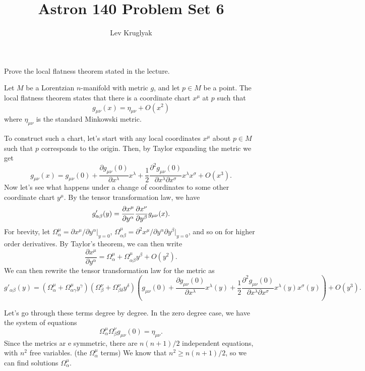 \documentclass{../../templates/lkx_pset}
\title{Astron 140 Problem Set 6}
\author{Lev Kruglyak}
\begin{document}
\maketitle

\begin{problem}{1}
Prove the local flatness theorem stated in the lecture.
\end{problem}

\begin{solution}
	Let $M$ be a Lorentzian $n$-manifold with metric $g$, and let $p\in M$ be a point.
	The local flatness theorem states that there is a coordinate chart $x^{\mu}$ at $p$ such that
	\[
		g_{\mu\nu}(x) = \eta_{\mu\nu} + O(x^2)
	\]
	where $\eta_{\mu\nu}$ is the standard Minkowski metric.

	To construct such a chart, let's start with any local coordinates $x^{\mu}$ about $p\in M$ such that $p$ corresponds to the origin. Then, by Taylor expanding the metric we get
	\[
		g_{\mu\nu}(x) = g_{\mu\nu}(0) + \frac{\partial g_{\mu\nu}(0)}{\partial x^{\lambda}} x^{\lambda} + \frac{1}{2}\frac{\partial^2 g_{\mu\nu}(0)}{\partial x^{\lambda} \partial x^{\sigma}} x^{\lambda} x^{\sigma} + O(x^3).
	\]
	Now let's see what happens under a change of coordinates to some other coordinate chart $y^{\mu}$. By the tensor transformation law, we have
	\[
		g'_{\alpha\beta}(y) = \frac{\partial x^{\mu}}{\partial y^\alpha}\frac{\partial x^\nu}{\partial y^\beta} g_{\mu\nu}(x).
	\]
	For brevity, let $\Omega^\mu_\alpha = \partial x^\mu / \partial y^{\alpha}|_{y=0}$, $\Omega^\mu_{\alpha\beta} = \partial^2 x^{\mu} / \partial y^{\alpha}\partial y^{\beta}|_{y=0}$, and so on for higher order derivatives. By Taylor's theorem, we can then write
	\[
		\frac{\partial x^\mu}{\partial y^\alpha} = \Omega^\mu_{\alpha} + \Omega^\mu_{\alpha\beta}y^\beta + O(y^2).
	\]
	We can then rewrite the tensor transformation law for the metric as
	\[
		g'_{\alpha\beta}(y) = (\Omega^\mu_{\alpha} + \Omega^\mu_{\alpha\gamma}y^\gamma)(\Omega^\nu_\beta + \Omega^\nu_{\beta\delta}y^\delta)\left(g_{\mu\nu}(0) + \frac{\partial g_{\mu\nu}(0)}{\partial x^{\lambda}}x^\lambda(y) + \frac{1}{2}\frac{\partial^2 g_{\mu\nu}(0)}{\partial x^{\lambda} \partial x^{\sigma}} x^\lambda(y)x^{\sigma}(y) \right) + O(y^3).
	\]

	Let's go through these terms degree by degree. In the zero degree case, we have the system of equations
	\[
		\Omega^\mu_\alpha\Omega^\nu_\beta g_{\mu\nu}(0) = \eta_{\mu\nu}.
	\]
	Since the metrics ar
	e symmetric, there are $n(n+1)/2$ independent equations, with $n^2$ free variables. (the $\Omega^\mu_\alpha$ terms) We know that $n^2 \geq n(n+1)/2$, so we can find solutions $\Omega^\mu_\alpha$.


\end{solution}
\end{document}
